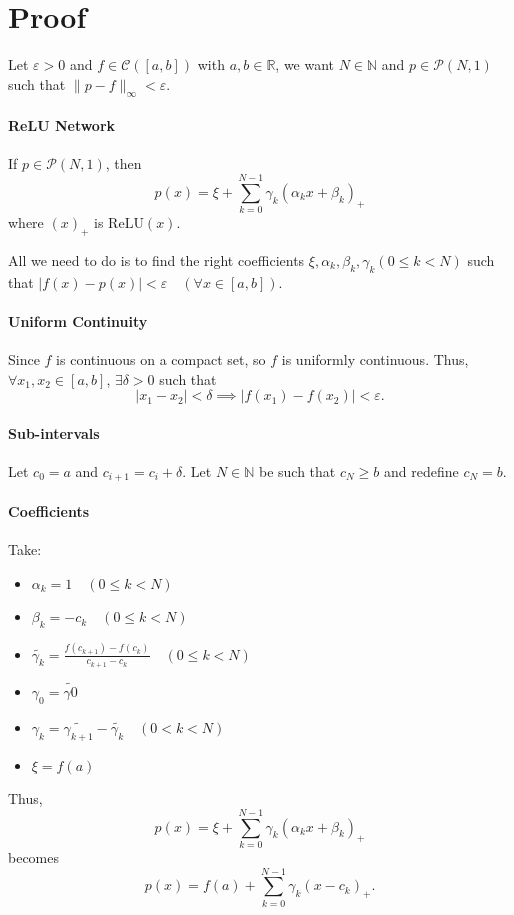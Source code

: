 \documentclass[]{article}
\begin{document}
\section{Proof}
Let $\varepsilon >0$ and $f \in \mathcal{C}(\left[ a,b \right])$ with $a,b \in \mathbb{R}$, we want $N \in \mathbb{N}$ and $p \in \mathcal{P}(N,1)$ such that $\|p-f\|_\infty < \varepsilon$.

\paragraph{ReLU Network}
If $p \in \mathcal{P}(N,1)$, then 
$$p(x) = \xi + \sum_{k=0}^{N-1} \gamma_k (\alpha_k x + \beta_k)_+$$
where $(x)_+$ is $\text{ReLU}(x)$.

All we need to do is to find the right coefficients $\xi, \alpha_k, \beta_k, \gamma_k (0 \leq k < N)$ such that $|f(x)-p(x)| < \varepsilon \quad (\forall x \in \left[ a,b \right])$.

\paragraph{Uniform Continuity}
Since $f$ is continuous on a compact set, so $f$ is uniformly continuous.
Thus, $\forall x_1,x_2 \in \left[ a,b \right]$, $\exists \delta>0$ such that 
$$|x_1-x_2| < \delta \implies |f(x_1) - f(x_2)| < \varepsilon.$$

\paragraph{Sub-intervals}
Let $c_0 = a$ and $c_{i+1} = c_i + \delta$. Let $N \in \mathbb{N}$ be such that $c_N \geq b$ and redefine $c_N = b$.

\paragraph{Coefficients}
Take:
\begin{itemize}
	\item $\alpha_k = 1 \quad (0 \leq k < N)$
	\item $\beta_k = -c_k \quad (0 \leq k < N)$
	\item $\tilde{\gamma_k} = \frac{f(c_{k+1})-f(c_k)}{c_{k+1}-c_k} \quad (0 \leq k < N)$
	\item $\gamma_0 = \tilde{\gamma0}$
	\item $\gamma_k = \tilde{\gamma_{k+1}} - \tilde{\gamma_k}  \quad (0 < k < N)$
	\item $\xi = f(a)$
\end{itemize}
Thus, $$p(x) = \xi + \sum_{k=0}^{N-1} \gamma_k (\alpha_k x + \beta_k)_+$$
becomes $$p(x) = f(a) + \sum_{k=0}^{N-1} \gamma_k (x - c_k)_+.$$
\end{document}
